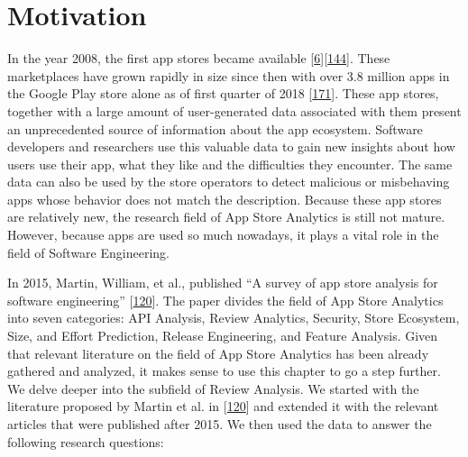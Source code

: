 \documentclass[]{book}
\begin{document}
\section{Motivation}\label{motivation-6}

In the year 2008, the first app stores became available
{[}\protect\hyperlink{ref-appStoreLaunch}{6}{]}{[}\protect\hyperlink{ref-androidMarketLaunch}{144}{]}.
These marketplaces have grown rapidly in size since then with over 3.8
million apps in the Google Play store alone as of first quarter of 2018
{[}\protect\hyperlink{ref-appNumber}{171}{]}. These app stores, together
with a large amount of user-generated data associated with them present
an unprecedented source of information about the app ecosystem. Software
developers and researchers use this valuable data to gain new insights
about how users use their app, what they like and the difficulties they
encounter. The same data can also be used by the store operators to
detect malicious or misbehaving apps whose behavior does not match the
description. Because these app stores are relatively new, the research
field of App Store Analytics is still not mature. However, because apps
are used so much nowadays, it plays a vital role in the field of
Software Engineering.

In 2015, Martin, William, et al., published ``A survey of app store
analysis for software engineering''
{[}\protect\hyperlink{ref-martin2015survey}{120}{]}. The paper divides
the field of App Store Analytics into seven categories: API Analysis,
Review Analytics, Security, Store Ecosystem, Size, and Effort
Prediction, Release Engineering, and Feature Analysis. Given that
relevant literature on the field of App Store Analytics has been already
gathered and analyzed, it makes sense to use this chapter to go a step
further. We delve deeper into the subfield of Review Analysis. We
started with the literature proposed by Martin et al. in
{[}\protect\hyperlink{ref-martin2015survey}{120}{]} and extended it with
the relevant articles that were published after 2015. We then used the
data to answer the following research questions:
\end{document}
